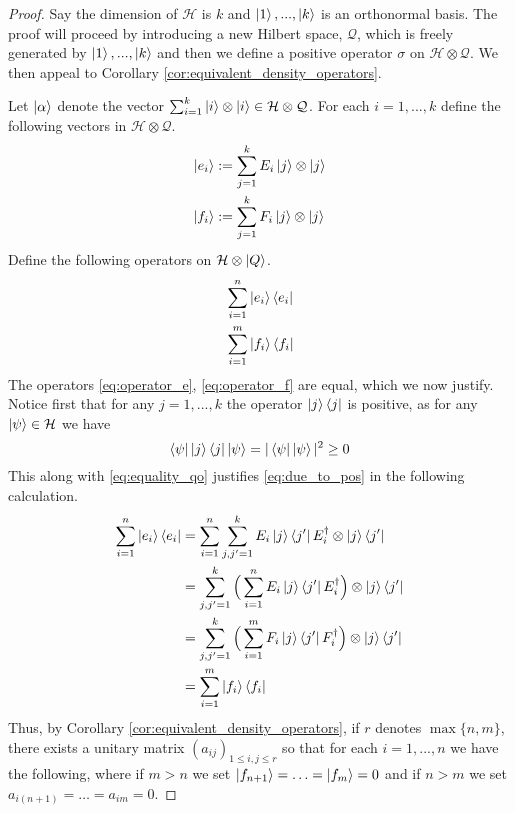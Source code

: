 \documentclass[12pt]{article}
\theoremstyle{plain}
\theoremstyle{definition}
\newcommand{\call}[1]{\mathcal{#1}}
\begin{document}
	\begin{proof}
		Say the dimension of $\call{H}$ is $k$ and $\ket{1},...,\ket{k}$ is an orthonormal basis. The proof will proceed by introducing a new Hilbert space, $\call{Q}$, which is freely generated by $\ket{1},...,\ket{k}$ and then we define a positive operator $\sigma$ on $\call{H} \otimes \call{Q}$. We then appeal to Corollary \ref{cor:equivalent_density_operators}.
		
		Let $\ket{\alpha}$ denote the vector $\sum_{i = 1}^k \ket{i} \otimes \ket{i} \in \call{H} \otimes \call{Q}$. For each $i = 1,..., k$ define the following vectors in $\call{H} \otimes \call{Q}$.
		\begin{align}
			\ket{e_i} &:= \sum_{j = 1}^k E_i\ket{j} \otimes \ket{j}\\
			\ket{f_i} &:= \sum_{j = 1}^k F_i \ket{j} \otimes \ket{j}
		\end{align}
		Define the following operators on $\call{H} \otimes \ket{Q}$.
		\begin{align}
			\label{eq:operator_e}&\sum_{i = 1}^n \ket{e_i}\bra{e_i}\\
			\label{eq:operator_f}&\sum_{i = 1}^m \ket{f_i} \bra{f_i}
		\end{align}
		The operators \eqref{eq:operator_e}, \eqref{eq:operator_f} are equal, which we now justify. Notice first that for any $j = 1,...,k$ the operator $\ket{j}\bra{j}$ is positive, as for any $\ket{\psi} \in \call{H}$ we have
		\begin{equation}
			\bra{\psi}\ket{j}\bra{j}\ket{\psi} = |\bra{\psi}\ket{\psi}|^2 \geq 0
		\end{equation}
		This along with \eqref{eq:equality_qo} justifies \eqref{eq:due_to_pos} in the following calculation.
		\begin{align}
			\sum_{i = 1}^n \ket{e_i}\bra{e_i} &= \sum_{i = 1}^n\sum_{j,j' = 1}^k E_i \ket{j}\bra{j'}E_i^\dagger \otimes \ket{j}\bra{j'}\\
			&=\sum_{j,j' = 1}^k \Big(\sum_{i = 1}^n E_i \ket{j}\bra{j'}E_i^\dagger\Big) \otimes \ket{j}\bra{j'}\\
			\label{eq:due_to_pos}&= \sum_{j,j' = 1}^k \Big(\sum_{i = 1}^m F_i \ket{j}\bra{j'}F_i^\dagger\Big) \otimes \ket{j}\bra{j'}\\
			&= \sum_{i = 1}^m \ket{f_i}\bra{f_i}
		\end{align}
		Thus, by Corollary \ref{cor:equivalent_density_operators}, if $r$ denotes $\operatorname{max}\lbrace n,m \rbrace$, there exists a unitary matrix $(a_{ij})_{1 \leq i, j \leq r}$ so that for each $i = 1,...,n$ we have the following, where if $m > n$ we set $\ket{f_{n+1}} = \hdots = \ket{f_m} = 0$ and if $n > m$ we set $a_{i(n+1)} = \hdots = a_{im} = 0$.

\end{proof}
\end{document}
